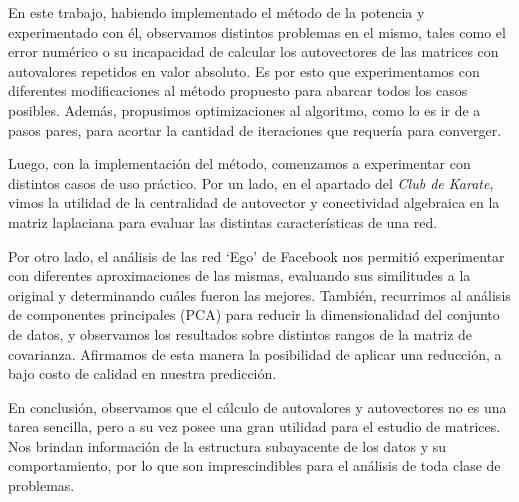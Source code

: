 \vspace{2em}

En este trabajo, habiendo implementado el método de la potencia y experimentado con él, observamos distintos problemas en el mismo, tales como el error numérico o su incapacidad de calcular los autovectores de las matrices con autovalores repetidos en valor absoluto. Es por esto que experimentamos con diferentes modificaciones al método propuesto para abarcar todos los casos posibles. Además, propusimos optimizaciones al algoritmo, como lo es ir de a pasos pares, para acortar la cantidad de iteraciones que requería para converger. 

\vspace{1em}
Luego, con la implementación del método, comenzamos a experimentar con distintos casos de uso práctico. Por un lado, en el apartado del \textit{Club de Karate}, vimos la utilidad de la centralidad de autovector y conectividad algebraica en la matriz laplaciana para evaluar las distintas características de una red. 

\vspace{1em}
Por otro lado, el análisis de las red `Ego' de Facebook nos permitió experimentar con diferentes aproximaciones de las mismas, evaluando sus similitudes a la original y determinando cuáles fueron las mejores. También, recurrimos al análisis de componentes principales (PCA) para reducir la dimensionalidad del conjunto de datos, y observamos los resultados sobre distintos rangos de la matriz de covarianza. Afirmamos de esta manera la posibilidad de aplicar una reducción, a bajo costo de calidad en nuestra predicción.

\vspace{1em}
En conclusión, observamos que el cálculo de autovalores y autovectores no es una tarea sencilla, pero a su vez posee una gran utilidad para el estudio de matrices. Nos brindan información de la estructura subayacente de los datos y su comportamiento, por lo que son imprescindibles para el análisis de toda clase de problemas.
